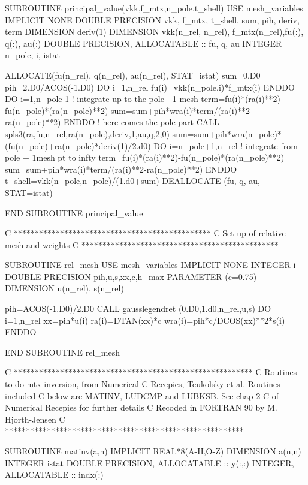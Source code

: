 \documentclass[%
oneside,                 %
final,                   %
10pt]{article}
\newenvironment{doconceexercise}{}{}
\begin{document}
\begin{doconceexercise}
      SUBROUTINE principal_value(vkk,f_mtx,n_pole,t_shell) 
      USE mesh_variables
      IMPLICIT NONE
      DOUBLE PRECISION vkk, f_mtx, t_shell, sum, pih, deriv, term
      DIMENSION deriv(1)
      DIMENSION vkk(n_rel, n_rel), f_mtx(n_rel),fu(:), q(:), au(:)
      DOUBLE PRECISION, ALLOCATABLE :: fu, q, au
      INTEGER n_pole, i, istat

      ALLOCATE(fu(n_rel), q(n_rel), au(n_rel), STAT=istat)
      sum=0.D0
      pih=2.D0/ACOS(-1.D0)
      DO i=1,n_rel
         fu(i)=vkk(n_pole,i)*f_mtx(i)
      ENDDO
      DO i=1,n_pole-1  ! integrate up to the pole - 1 mesh
         term=fu(i)*(ra(i)**2)-fu(n_pole)*(ra(n_pole)**2)
         sum=sum+pih*wra(i)*term/(ra(i)**2-ra(n_pole)**2)
      ENDDO       ! here comes the pole part
      CALL spls3(ra,fu,n_rel,ra(n_pole),deriv,1,au,q,2,0)      
      sum=sum+pih*wra(n_pole)*(fu(n_pole)+ra(n_pole)*deriv(1)/2.d0) 
      DO i=n_pole+1,n_rel  ! integrate from pole + 1mesh pt to infty
         term=fu(i)*(ra(i)**2)-fu(n_pole)*(ra(n_pole)**2)
         sum=sum+pih*wra(i)*term/(ra(i)**2-ra(n_pole)**2)
      ENDDO
      t_shell=vkk(n_pole,n_pole)/(1.d0+sum)
      DEALLOCATE (fu, q, au, STAT=istat)

      END SUBROUTINE principal_value

C         ***********************************************
C             Set up of relative mesh and weights
C         ***********************************************

      SUBROUTINE rel_mesh
      USE mesh_variables
      IMPLICIT NONE
      INTEGER i
      DOUBLE PRECISION pih,u,s,xx,c,h_max
      PARAMETER (c=0.75)
      DIMENSION u(n_rel), s(n_rel)

      pih=ACOS(-1.D0)/2.D0
      CALL gausslegendret (0.D0,1.d0,n_rel,u,s)
      DO i=1,n_rel
         xx=pih*u(i)
         ra(i)=DTAN(xx)*c
         wra(i)=pih*c/DCOS(xx)**2*s(i)
      ENDDO

      END SUBROUTINE rel_mesh

C     *********************************************************
C            Routines to do mtx inversion, from Numerical
C            Recepies, Teukolsky et al. Routines included
C            below are MATINV, LUDCMP and LUBKSB. See chap 2
C            of Numerical Recepies for further details
C            Recoded in FORTRAN 90 by M. Hjorth-Jensen
C     *********************************************************

      SUBROUTINE matinv(a,n)
      IMPLICIT REAL*8(A-H,O-Z)
      DIMENSION a(n,n)
      INTEGER istat
      DOUBLE PRECISION, ALLOCATABLE :: y(:,:)
      INTEGER, ALLOCATABLE :: indx(:)


\end{doconceexercise}
\end{document}
